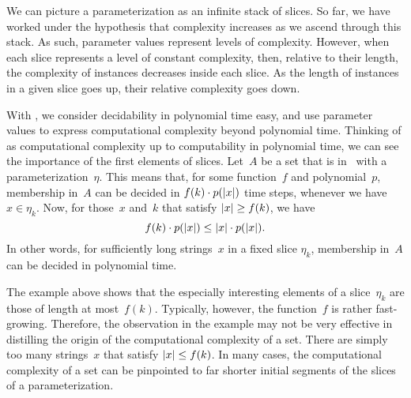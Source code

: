 \label{sec:redundancy}%

We can picture a parameterization as an infinite stack of slices.
So far, we have worked under the hypothesis that complexity increases as we ascend through this stack.
As such, parameter values represent levels of complexity.
However, when each slice represents a level of constant complexity, then, relative to their length, the complexity of instances decreases inside each slice.
As the length of instances in a given slice goes up, their relative complexity goes down.

\begin{example}
\label{ex:long_instances}%
  With , we consider decidability in polynomial time easy, and use parameter values to express computational complexity beyond polynomial time.
  Thinking of  as computational complexity up to computability in polynomial time, we can see the importance of the first elements of slices.
  Let~$A$ be a set that is in~ with a parameterization~$\eta$.
  This means that, for some function~$f$ and polynomial~$p$, membership in~$A$ can be decided in $f(k) \cdot p({\lvert x\rvert})$ time steps, whenever we have $x \in \eta_k$.
  Now, for those~$x$ and~$k$ that satisfy ${\lvert x\rvert} \ge f(k)$, we have
  \begin{equation*}
    f(k) \cdot p({\lvert x\rvert}) \le {\lvert x\rvert} \cdot p({\lvert x\rvert}).
  \end{equation*}
  In other words, for sufficiently long strings~$x$ in a fixed slice $\eta_k$, membership in~$A$ can be decided in polynomial time.
\end{example}

The example above shows that the especially interesting elements of a slice~$\eta_k$ are those of length at most~$f(k)$.
Typically, however, the function~$f$ is rather fast-growing.
Therefore, the observation in the example may not be very effective in distilling the origin of the computational complexity of a set.
There are simply too many strings~$x$ that satisfy ${\lvert x\rvert} \le f(k)$.
In many cases, the computational complexity of a set can be pinpointed to far shorter initial segments of the slices of a parameterization.

